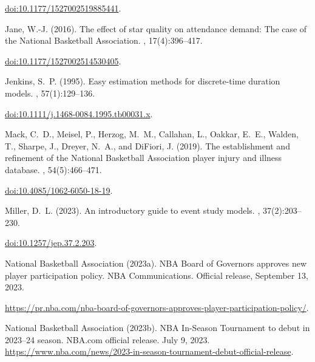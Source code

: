 \documentclass[11pt]{article}
\begin{document}
\begin{thebibliography}{}
\newblock \href{https://doi.org/10.1177/1527002519885441}{doi:10.1177/1527002519885441}.\par
{}
Jane, W.-J. (2016).
\newblock The effect of star quality on attendance demand: The case of the
  {National Basketball Association}.
, 17(4):396--417.

\newblock \href{https://doi.org/10.1177/1527002514530405}{doi:10.1177/1527002514530405}.\par
{}
Jenkins, S.~P. (1995).
\newblock Easy estimation methods for discrete-time duration models.
, 57(1):129--136.

\newblock \href{https://doi.org/10.1111/j.1468-0084.1995.tb00031.x}{doi:10.1111/j.1468-0084.1995.tb00031.x}.\par
{}
Mack, C.~D., Meisel, P., Herzog, M.~M., Callahan, L., Oakkar, E.~E., Walden,
  T., Sharpe, J., Dreyer, N.~A., and DiFiori, J. (2019).
\newblock The establishment and refinement of the National Basketball
  Association player injury and illness database.
, 54(5):466--471.

\newblock \href{https://doi.org/10.4085/1062-6050-18-19}{doi:10.4085/1062-6050-18-19}.\par
{}
Miller, D.~L. (2023).
\newblock An introductory guide to event study models.
, 37(2):203--230.

\newblock \href{https://doi.org/10.1257/jep.37.2.203}{doi:10.1257/jep.37.2.203}.\par
{}
{National Basketball Association} (2023a).
\newblock NBA Board of Governors approves new player participation policy.
\newblock NBA Communications.
\newblock Official release, September 13, 2023.

\newblock \url{https://pr.nba.com/nba-board-of-governors-approves-player-participation-policy/}.\par
{}
{National Basketball Association} (2023b).
\newblock NBA In-Season Tournament to debut in 2023--24 season.
\newblock NBA.com official release.
\newblock July 9, 2023.
\newblock \url{https://www.nba.com/news/2023-in-season-tournament-debut-official-release}.


\end{thebibliography}
\end{document}
